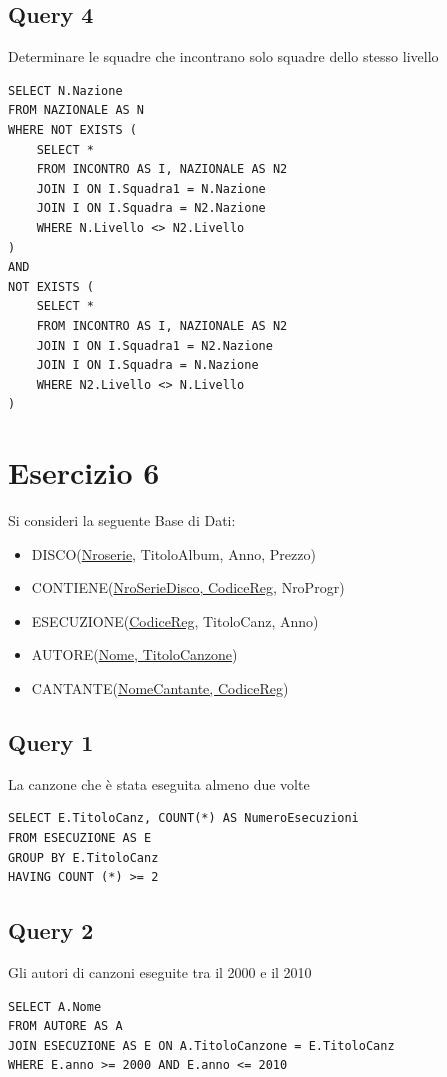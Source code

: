 \subsection{Query 4}
Determinare le squadre che incontrano solo squadre dello stesso livello
\begin{lstlisting}
SELECT N.Nazione
FROM NAZIONALE AS N
WHERE NOT EXISTS (
    SELECT *
    FROM INCONTRO AS I, NAZIONALE AS N2
    JOIN I ON I.Squadra1 = N.Nazione
    JOIN I ON I.Squadra = N2.Nazione
    WHERE N.Livello <> N2.Livello
)
AND
NOT EXISTS (
    SELECT *
    FROM INCONTRO AS I, NAZIONALE AS N2
    JOIN I ON I.Squadra1 = N2.Nazione
    JOIN I ON I.Squadra = N.Nazione
    WHERE N2.Livello <> N.Livello
)
\end{lstlisting}

\newpage
\section{Esercizio 6}
Si consideri la seguente Base di Dati:

\begin{itemize}
    \item DISCO(\underline{Nroserie}, TitoloAlbum, Anno, Prezzo)
    \item CONTIENE(\underline{NroSerieDisco, CodiceReg}, NroProgr)
    \item ESECUZIONE(\underline{CodiceReg}, TitoloCanz, Anno)
    \item AUTORE(\underline{Nome, TitoloCanzone})
    \item CANTANTE(\underline{NomeCantante, CodiceReg})
\end{itemize}

\subsection{Query 1}
La canzone che è stata eseguita almeno due volte
\begin{lstlisting}
SELECT E.TitoloCanz, COUNT(*) AS NumeroEsecuzioni
FROM ESECUZIONE AS E
GROUP BY E.TitoloCanz
HAVING COUNT (*) >= 2
\end{lstlisting}

\subsection{Query 2}
Gli autori di canzoni eseguite tra il 2000 e il 2010
\begin{lstlisting}
SELECT A.Nome
FROM AUTORE AS A
JOIN ESECUZIONE AS E ON A.TitoloCanzone = E.TitoloCanz
WHERE E.anno >= 2000 AND E.anno <= 2010
\end{lstlisting}

